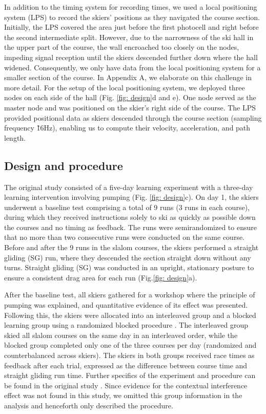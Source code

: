 \documentclass{article}
\begin{document}
In addition to the timing system for recording times, we used a local positioning system (LPS) to record the skiers' positions as they navigated the course section. Initially, the LPS covered the area just before the first photocell and right before the second intermediate split. However, due to the narrowness of the ski hall in the upper part of the course, the wall encroached too closely on the nodes, impeding signal reception until the skiers descended further down where the hall widened. Consequently, we only have data from the local positioning system for a smaller section of the course. In Appendix A, we elaborate on this challenge in more detail. For the setup of the local positioning system, we deployed three nodes on each side of the hall (Fig. \ref{fig: design}d and e). One node served as the master node and was positioned on the skier's right side of the course. The LPS provided positional data as skiers descended through the course section (sampling frequency \~16Hz), enabling us to compute their velocity, acceleration, and path length.

\subsection{Design and procedure}
The original study consisted of a five-day learning experiment with a three-day learning intervention involving pumping (Fig. \ref{fig: design}c). On day 1, the skiers underwent a baseline test comprising a total of 9 runs (3 runs in each course), during which they received instructions solely to ski as quickly as possible down the courses and no timing as feedback. The runs were semirandomized to ensure that no more than two consecutive runs were conducted on the same course. Before and after the 9 runs in the slalom courses, the skiers performed a straight gliding (SG) run, where they descended the section straight down without any turns. Straight gliding (SG) was conducted in an upright, stationary posture to ensure a consistent drag area for each run (Fig.\ref{fig: design}a).

After the baseline test, all skiers gathered for a workshop where the principle of pumping was explained, and quantitative evidence of its effect was presented. Following this, the skiers were allocated into an interleaved group and a blocked learning group using a randomized blocked procedure \cite{maxwell_designing_2017}. The interleaved group skied all slalom courses on the same day in an interleaved order, while the blocked group completed only one of the three courses per day (randomized and counterbalanced across skiers). The skiers in both groups received race times as feedback after each trial, expressed as the difference between course time and straight gliding run time. Further specifics of the experiment and procedure can be found in the original study \cite{magelssen_is_2022}. Since evidence for the contextual interference effect was not found in this study, we omitted this group information in the analysis and henceforth only described the procedure.
\end{document}
